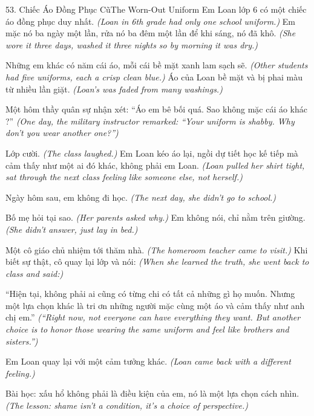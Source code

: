 \begin{truyen}{53. Chiếc Áo Đồng Phục Cũ}{The Worn-Out Uniform}
Em Loan lớp 6 có một chiếc áo đồng phục duy nhất.
\textit{(Loan in 6th grade had only one school uniform.)}
Em mặc nó ba ngày một lần, rửa nó ba đêm một lần để khi sáng, nó đã khô.
\textit{(She wore it three days, washed it three nights so by morning it was dry.)}

Những em khác có năm cái áo, mỗi cái bề mặt xanh lam sạch sẽ.
\textit{(Other students had five uniforms, each a crisp clean blue.)}
Áo của Loan bề mặt và bị phai màu từ nhiều lần giặt.
\textit{(Loan's was faded from many washings.)}

Một hôm thầy quân sự nhận xét: ``Áo em bê bối quá. Sao không mặc cái áo khác ?''
\textit{(One day, the military instructor remarked: ``Your uniform is shabby. Why don't you wear another one?'')}

Lớp cười.
\textit{(The class laughed.)}
Em Loan kéo áo lại, ngồi dự tiết học kế tiếp mà cảm thấy như một ai đó khác, không phải em Loan.
\textit{(Loan pulled her shirt tight, sat through the next class feeling like someone else, not herself.)}

Ngày hôm sau, em không đi học.
\textit{(The next day, she didn't go to school.)}

Bố mẹ hỏi tại sao.
\textit{(Her parents asked why.)}
Em không nói, chỉ nằm trên giường.
\textit{(She didn't answer, just lay in bed.)}

Một cô giáo chủ nhiệm tới thăm nhà.
\textit{(The homeroom teacher came to visit.)}
Khi biết sự thật, cô quay lại lớp và nói:
\textit{(When she learned the truth, she went back to class and said:)}

``Hiện tại, không phải ai cũng có từng chi có tất cả những gì họ muốn. Nhưng một lựa chọn khác là tri ơn những người mặc cùng một áo và cảm thấy như anh chị em.''
\textit{(``Right now, not everyone can have everything they want. But another choice is to honor those wearing the same uniform and feel like brothers and sisters.'')}

Em Loan quay lại với một cảm tưởng khác.
\textit{(Loan came back with a different feeling.)}

Bài học: xấu hổ không phải là điều kiện của em, nó là một lựa chọn cách nhìn.
\textit{(The lesson: shame isn't a condition, it's a choice of perspective.)}
\end{truyen}

